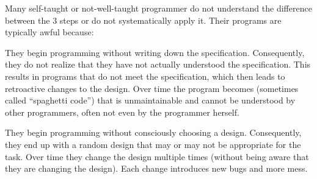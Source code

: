Many self-taught or not-well-taught programmer do not understand the difference between the $3$ steps or do not systematically apply it.
Their programs are typically awful because:
\begin{compactitem}
 \item They begin programming without writing down the specification.
 Consequently, they do not realize that they have not actually understood the specification.
 This results in programs that do not meet the specification, which then leads to retroactive changes to the design.
 Over time the program becomes (sometimes called ``spaghetti code'') that is unmaintainable and cannot be understood by other programmers, often not even by the programmer herself.
 \item They begin programming without consciously choosing a design.
 Consequently, they end up with a random design that may or may not be appropriate for the task.
 Over time they change the design multiple times (without being aware that they are changing the design).
 Each change introduces new bugs and more mess.
\end{compactitem}

